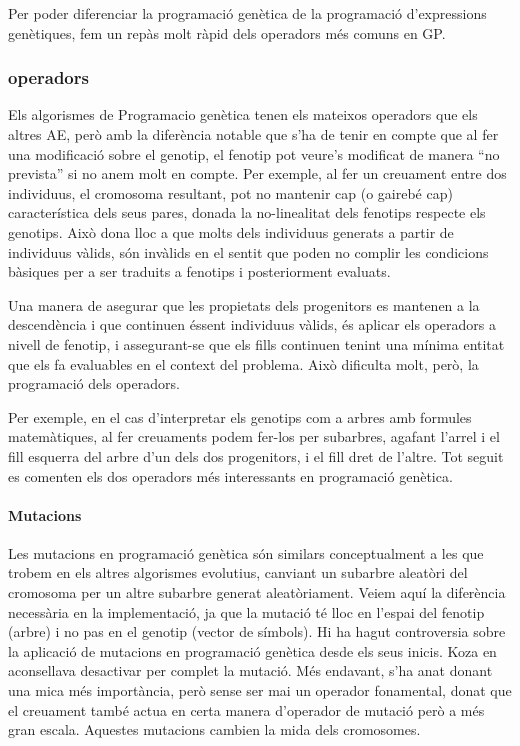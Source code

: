 Per poder diferenciar la programació genètica de la programació d'expressions
genètiques, fem un repàs molt ràpid dels operadors més comuns en GP.

\subsubsection{operadors} %
\label{ssub:operadors}

Els algorismes de Programacio genètica tenen els mateixos operadors que els
altres AE, però amb la diferència notable que s'ha de tenir en compte que al fer
una modificació sobre el genotip, el fenotip pot veure's modificat de manera
``no prevista'' si no anem molt en compte.  Per exemple, al fer un creuament
entre dos individuus, el cromosoma resultant, pot no mantenir cap (o gairebé
cap) característica dels seus pares, donada la no-linealitat dels fenotips
respecte els genotips.  Això dona lloc a que molts dels individuus generats a
partir de individuus vàlids, són invàlids en el sentit que poden no complir les
condicions bàsiques per a ser traduits a fenotips i posteriorment evaluats.

Una manera de asegurar que les propietats dels progenitors es mantenen a la
descendència i que continuen éssent individuus vàlids, és aplicar els operadors
a nivell de fenotip, i assegurant-se que els fills continuen tenint una mínima
entitat que els fa evaluables en el context del problema.  Això dificulta molt,
però, la programació dels operadors.

Per exemple, en el cas d'interpretar els genotips com a arbres amb formules
matemàtiques, al fer creuaments podem fer-los per subarbres, agafant l'arrel i
el fill esquerra del arbre d'un dels dos progenitors, i el fill dret de l'altre.
Tot seguit es comenten els dos operadors més interessants en programació
genètica.

\paragraph{Mutacions} %
\label{par:Mutacions}
Les mutacions en programació genètica són similars conceptualment a les que
trobem en els altres algorismes evolutius, canviant un subarbre aleatòri del
cromosoma per un altre subarbre generat aleatòriament.  Veiem aquí la diferència
necessària en la implementació, ja que la mutació té lloc en l'espai del fenotip
(arbre) i no pas en el genotip (vector de símbols).  Hi ha hagut controversia
sobre la aplicació de mutacions en programació genètica desde els seus inicis.
Koza en \cite{koza:92} aconsellava desactivar per complet la mutació.   Més
endavant, s'ha anat donant una mica més importància, però sense ser mai un
operador fonamental, donat que el creuament també actua en certa manera
d'operador de mutació però a més gran escala.  Aquestes mutacions cambien la
mida dels cromosomes.

